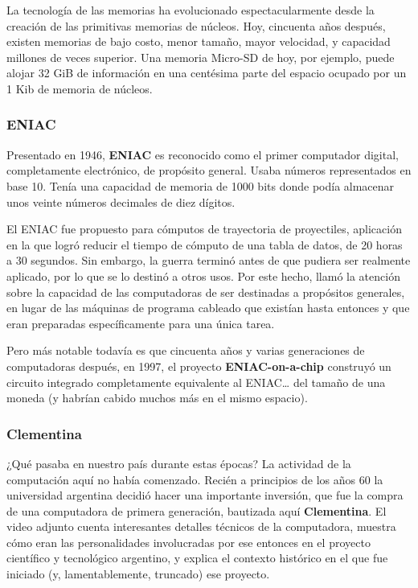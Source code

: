 \documentclass[spanish,A4,]{article}
\begin{document}
La tecnología de las memorias ha evolucionado espectacularmente desde la
creación de las primitivas memorias de núcleos. Hoy, cincuenta años
después, existen memorias de bajo costo, menor tamaño, mayor velocidad,
y capacidad millones de veces superior. Una memoria Micro-SD de hoy, por
ejemplo, puede alojar 32 GiB de información en una centésima parte del
espacio ocupado por un 1 Kib de memoria de núcleos.

\subsubsection{ENIAC}\label{eniac}

Presentado en 1946, \textbf{ENIAC} es reconocido como el primer
computador digital, completamente electrónico, de propósito general.
Usaba números representados en base 10. Tenía una capacidad de memoria
de 1000 bits donde podía almacenar unos veinte números decimales de diez
dígitos.

El ENIAC fue propuesto para cómputos de trayectoria de proyectiles,
aplicación en la que logró reducir el tiempo de cómputo de una tabla de
datos, de 20 horas a 30 segundos. Sin embargo, la guerra terminó antes
de que pudiera ser realmente aplicado, por lo que se lo destinó a otros
usos. Por este hecho, llamó la atención sobre la capacidad de las
computadoras de ser destinadas a propósitos generales, en lugar de las
máquinas de programa cableado que existían hasta entonces y que eran
preparadas específicamente para una única tarea.

Pero más notable todavía es que cincuenta años y varias generaciones de
computadoras después, en 1997, el proyecto \textbf{ENIAC-on-a-chip}
construyó un circuito integrado completamente equivalente al
ENIAC\ldots{} del tamaño de una moneda (y habrían cabido muchos más en
el mismo espacio).

\subsubsection{Clementina}\label{clementina}

¿Qué pasaba en nuestro país durante estas épocas? La actividad de la
computación aquí no había comenzado. Recién a principios de los años 60
la universidad argentina decidió hacer una importante inversión, que fue
la compra de una computadora de primera generación, bautizada aquí
\textbf{Clementina}. El video adjunto cuenta interesantes detalles
técnicos de la computadora, muestra cómo eran las personalidades
involucradas por ese entonces en el proyecto científico y tecnológico
argentino, y explica el contexto histórico en el que fue iniciado (y,
lamentablemente, truncado) ese proyecto.
\end{document}
